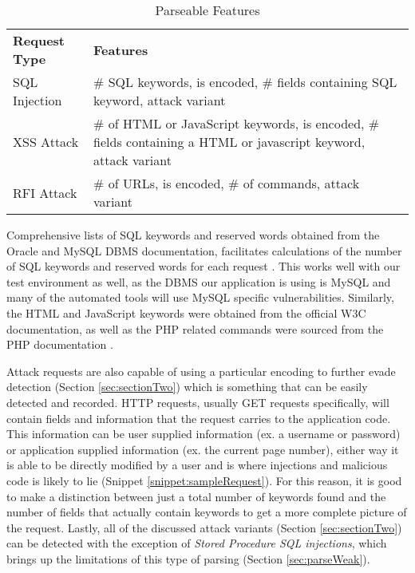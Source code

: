 \begin{table}
	\centering
	\begin{tabular}{|p{1.5in}|p{4.5in}|}
	\hline
		\textbf{Request Type} & \textbf{Features}\\
	\hhline{|=|=|}
		SQL Injection & \# SQL keywords, is encoded, \# fields containing SQL keyword, attack variant\\
	\hline
		XSS Attack & \# of HTML or JavaScript keywords, is encoded, \# fields containing a HTML or javascript keyword, attack variant\\
	\hline
		RFI Attack & \# of URLs, is encoded, \# of commands, attack variant\\
	\hline
	\end{tabular}
	\caption{Parseable Features}
	\label{tab:features}
\end{table}

Comprehensive lists of SQL keywords and reserved words obtained from the Oracle and MySQL DBMS documentation, facilitates calculations of the number of SQL keywords and reserved words for each request \cite{oracle, mysql}.  This works well with our test environment as well, as the DBMS our application is using is MySQL and many of the automated tools will use MySQL specific vulnerabilities.  Similarly, the HTML and JavaScript keywords were obtained from the official W3C documentation\cite{w3c1, w3c2, w3c3}, as well as the PHP related commands were sourced from the PHP documentation \cite{php}.

Attack requests are also capable of using a particular encoding to further evade detection (Section \ref{sec:sectionTwo}) which is something that can be easily detected and recorded.  HTTP requests, usually GET requests specifically, will contain fields and information that the request carries to the application code.  This information can be user supplied information (ex. a username or password) or application supplied information (ex. the current page number), either way it is able to be directly modified by a user and is where injections and malicious code is likely to lie (Snippet \ref{snippet:sampleRequest}).  For this reason, it is good to make a distinction between just a total number of keywords found and the number of fields that actually contain keywords to get a more complete picture of the request.  Lastly, all of the discussed attack variants (Section \ref{sec:sectionTwo}) can be detected with the exception of \emph{Stored Procedure SQL injections}, which brings up the limitations of this type of parsing (Section \ref{sec:parseWeak}).

